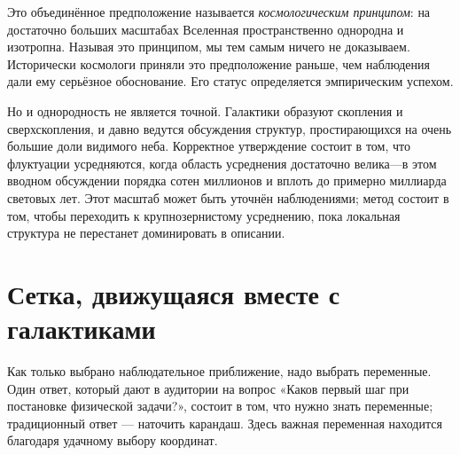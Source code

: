 \begin{classroomqa}
\end{classroomqa}

Это объединённое предположение называется \emph{космологическим принципом}: на достаточно больших масштабах Вселенная пространственно однородна и изотропна. Называя это принципом, мы тем самым ничего не доказываем. Исторически космологи приняли это предположение раньше, чем наблюдения дали ему серьёзное обоснование. Его статус определяется эмпирическим успехом.

Но и однородность не является точной. Галактики образуют скопления и сверхскопления, и давно ведутся обсуждения структур, простирающихся на очень большие доли видимого неба. Корректное утверждение состоит в том, что флуктуации усредняются, когда область усреднения достаточно велика---в этом вводном обсуждении порядка сотен миллионов и вплоть до примерно миллиарда световых лет. Этот масштаб может быть уточнён наблюдениями; метод состоит в том, чтобы переходить к крупнозернистому усреднению, пока локальная структура не перестанет доминировать в описании.

\begin{classroomqa}
\end{classroomqa}

\section{Сетка, движущаяся вместе с галактиками}

Как только выбрано наблюдательное приближение, надо выбрать переменные. Один ответ, который дают в аудитории на вопрос «Каков первый шаг при постановке физической задачи?», состоит в том, что нужно знать переменные; традиционный ответ — наточить карандаш. Здесь важная переменная находится благодаря удачному выбору координат.

